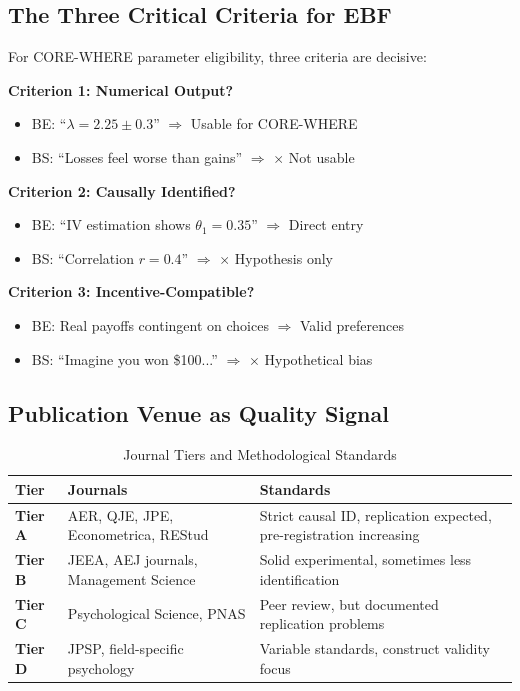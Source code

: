 \documentclass[11pt, a4paper]{article}
\begin{document}
\subsection{The Three Critical Criteria for EBF}

For CORE-WHERE parameter eligibility, three criteria are decisive:

\begin{tcolorbox}[colback=red!5!white, colframe=red!75!black,
    title=Critical Criteria for Parameter Use]

\textbf{Criterion 1: Numerical Output?}
\begin{itemize}[nosep]
    \item BE: ``$\lambda = 2.25 \pm 0.3$'' $\Rightarrow$ \checkmark Usable for CORE-WHERE
    \item BS: ``Losses feel worse than gains'' $\Rightarrow$ $\times$ Not usable
\end{itemize}

\textbf{Criterion 2: Causally Identified?}
\begin{itemize}[nosep]
    \item BE: ``IV estimation shows $\theta_1 = 0.35$'' $\Rightarrow$ \checkmark Direct entry
    \item BS: ``Correlation $r = 0.4$'' $\Rightarrow$ $\times$ Hypothesis only
\end{itemize}

\textbf{Criterion 3: Incentive-Compatible?}
\begin{itemize}[nosep]
    \item BE: Real payoffs contingent on choices $\Rightarrow$ \checkmark Valid preferences
    \item BS: ``Imagine you won \$100...'' $\Rightarrow$ $\times$ Hypothetical bias
\end{itemize}

\end{tcolorbox}

\subsection{Publication Venue as Quality Signal}

\begin{table}[htbp]
\centering
\caption{Journal Tiers and Methodological Standards}
\label{tab:evd-journals}
\renewcommand{\arraystretch}{1.2}
\begin{tabular}{@{}lp{5cm}p{5cm}@{}}
\toprule
\textbf{Tier} & \textbf{Journals} & \textbf{Standards} \\
\midrule
\textbf{Tier A} & AER, QJE, JPE, Econometrica, REStud & Strict causal ID, replication expected, pre-registration increasing \\
\textbf{Tier B} & JEEA, AEJ journals, Management Science & Solid experimental, sometimes less identification \\
\textbf{Tier C} & Psychological Science, PNAS & Peer review, but documented replication problems \\
\textbf{Tier D} & JPSP, field-specific psychology & Variable standards, construct validity focus \\
\bottomrule
\end{tabular}
\end{table}
\end{document}
